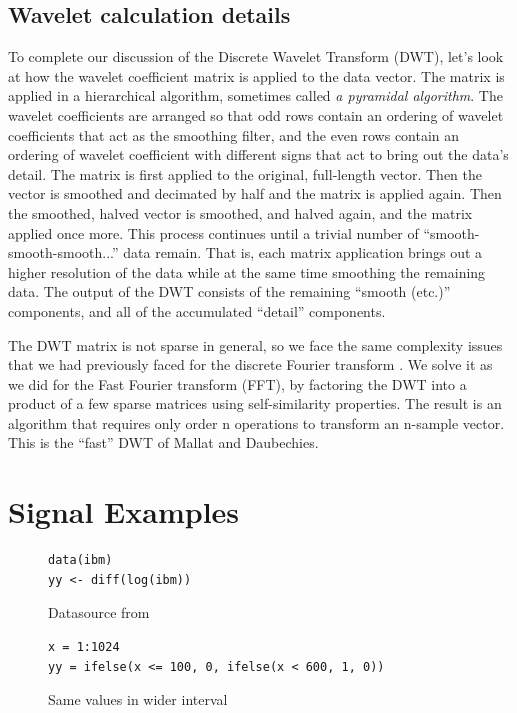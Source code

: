 \documentclass{article}
\begin{document}
\subsection{Wavelet calculation details}

To complete our discussion of the Discrete Wavelet Transform (DWT), let’s look at how the wavelet coefficient matrix is
applied to the data vector. The matrix is applied in a hierarchical algorithm, sometimes called \textit{a
pyramidal algorithm}. The wavelet coefficients are arranged so that odd rows contain an ordering of
wavelet coefficients that act as the smoothing filter, and the even rows contain an ordering of wavelet
coefficient with different signs that act to bring out the data’s detail. The matrix is first applied to
the original, full-length vector. Then the vector is smoothed and decimated by half and the matrix
is applied again. Then the smoothed, halved vector is smoothed, and halved again, and the matrix
applied once more. This process continues until a trivial number of “smooth-smooth-smooth...”
data remain. That is, each matrix application brings out a higher resolution of the data while at
the same time smoothing the remaining data. The output of the DWT consists of the remaining
“smooth (etc.)” components, and all of the accumulated “detail” components.

The DWT matrix is not sparse in general, so we face the same complexity issues that we had
previously faced for the discrete Fourier transform \cite{wickerhauser1994adapted}. We solve it as we did for the Fast Fourier transform (FFT), by
factoring the DWT into a product of a few sparse matrices using self-similarity properties. The
result is an algorithm that requires only order n operations to transform an n-sample vector. This
is the “fast” DWT of Mallat and Daubechies.


\section{Signal Examples}

\begin{figure}[h!]
\begin{lstlisting}
data(ibm)     
yy <- diff(log(ibm))
\end{lstlisting}

\caption{Datasource from \cite{genccay2001introduction}}
\end{figure}

\begin{figure}[h!]
\begin{lstlisting}
x = 1:1024
yy = ifelse(x <= 100, 0, ifelse(x < 600, 1, 0))
\end{lstlisting}
\caption{Same values in wider interval}
\end{figure}
\end{document}
